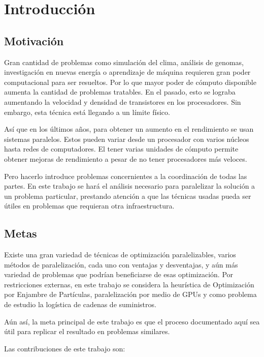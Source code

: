\chapter{Introducción}
\label{cap:intro}

\section{Motivación}

Gran cantidad de problemas como simulación del clima, análisis de genomas,
investigación en nuevas energía o aprendizaje de máquina \cite{Pacheco2011}
requieren gran poder computacional para ser resueltos. Por lo que mayor poder
de cómputo disponible aumenta la cantidad de problemas tratables. En el pasado,
esto se lograba aumentando la velocidad y densidad de transistores en los
procesadores. Sin embargo, esta técnica está llegando a un límite físico.

Así que en los últimos años, para obtener un aumento en el rendimiento se usan
sistemas paralelos. Estos pueden variar desde un procesador con varios núcleos
hasta redes de computadores. El tener varias unidades de cómputo permite
obtener mejoras de rendimiento a pesar de no tener procesadores más veloces.

Pero hacerlo introduce problemas concernientes a la coordinación de todas las
partes. En este trabajo se hará el análisis necesario para paralelizar la
solución a un problema particular, prestando atención a que las técnicas usadas
pueda ser útiles en problemas que requieran otra infraestructura.

\section{Metas}

Existe una gran variedad de técnicas de optimización paralelizables, varios
métodos de paralelización, cada uno con ventajas y desventajas, y aún más
variedad de problemas que podrían beneficiarse de esas optimización. Por
restricciones externas, en este trabajo se considera la heurística de
Optimización por Enjambre de Partículas, paralelización por medio de GPUs y
como problema de estudio la logística de cadenas de suministros.

Aún así, la meta principal de este trabajo es que el proceso documentado aquí
sea útil para replicar el resultado en problemas similares.

Las contribuciones de este trabajo son:


